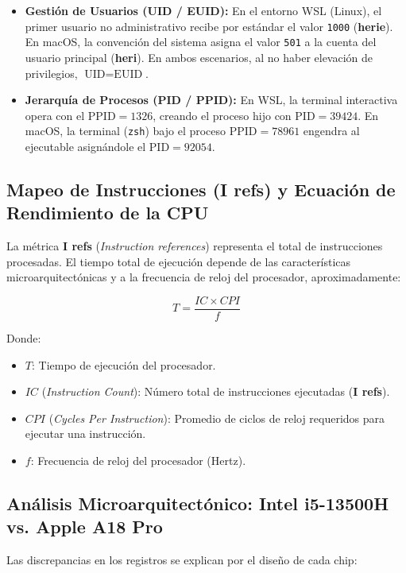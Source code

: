 \documentclass[12pt,oneside]{template/liverpoolthesis}
\begin{document}
\begin{itemize}
    \item \textbf{Gestión de Usuarios (UID / EUID):} En el entorno WSL (Linux), el primer usuario no administrativo recibe por estándar el valor \texttt{1000} (\textbf{herie}). En macOS, la convención del sistema asigna el valor \texttt{501} a la cuenta del usuario principal (\textbf{heri}). En ambos escenarios, al no haber elevación de privilegios, $\text{UID} = \text{EUID}$.
    \item \textbf{Jerarquía de Procesos (PID / PPID):} En WSL, la terminal interactiva opera con el $\text{PPID} = 1326$, creando el proceso hijo con $\text{PID} = 39424$. En macOS, la terminal (\texttt{zsh}) bajo el proceso $\text{PPID} = 78961$ engendra al ejecutable asignándole el $\text{PID} = 92054$.
\end{itemize}


\subsection{Mapeo de Instrucciones (I refs) y Ecuación de Rendimiento de la CPU}

La métrica \textbf{I refs} (\textit{Instruction references}) representa el total de instrucciones procesadas. El tiempo total de ejecución depende de las características microarquitectónicas y a la frecuencia de reloj del procesador, aproximadamente:

$$T = \frac{IC \times CPI}{f}$$

Donde:
\begin{itemize}
    \item $T$: Tiempo de ejecución del procesador.
    \item $IC$ (\textit{Instruction Count}): Número total de instrucciones ejecutadas (\textbf{I refs}).
    \item $CPI$ (\textit{Cycles Per Instruction}): Promedio de ciclos de reloj requeridos para ejecutar una instrucción.
    \item $f$: Frecuencia de reloj del procesador (Hertz).
\end{itemize}

\subsection{Análisis Microarquitectónico: Intel i5-13500H vs. Apple A18 Pro}

Las discrepancias en los registros se explican por el diseño de cada chip:
\end{document}
